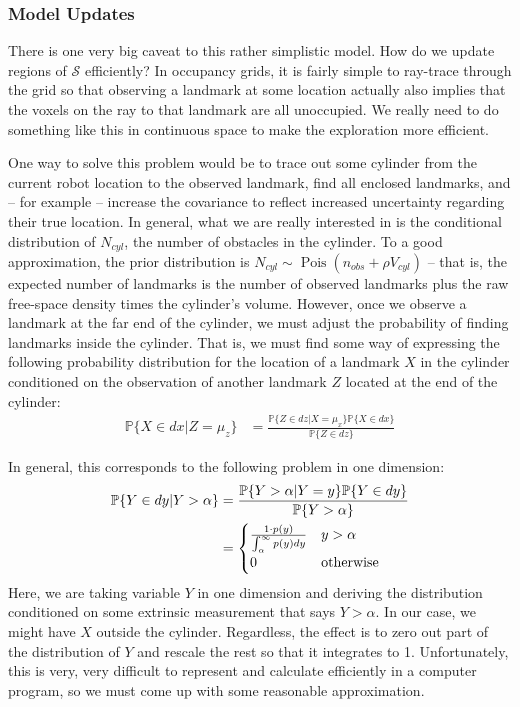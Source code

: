 \documentclass[12pt]{article}
\DeclareMathOperator{\Pois}{Pois}
\begin{document}
\subsubsection{Model Updates}

There is one very big caveat to this rather simplistic model. How do we update regions of $\mathcal{S}$ efficiently? In occupancy grids, it is fairly simple to ray-trace through the grid so that observing a landmark at some location actually also implies that the voxels on the ray to that landmark are all unoccupied. We really need to do something like this in continuous space to make the exploration more efficient.

One way to solve this problem would be to trace out some cylinder from the current robot location to the observed landmark, find all enclosed landmarks, and -- for example -- increase the covariance to reflect increased uncertainty regarding their true location. In general, what we are really interested in is the conditional distribution of $N_{cyl}$, the number of obstacles in the cylinder. To a good approximation, the prior distribution is $N_{cyl} \sim \Pois(n_{obs} + \rho V_{cyl})$ -- that is, the expected number of landmarks is the number of observed landmarks plus the raw free-space density times the cylinder's volume. However, once we observe a landmark at the far end of the cylinder, we must adjust the probability of finding landmarks inside the cylinder. That is, we must find some way of expressing the following probability distribution for the location of a landmark $X$ in the cylinder conditioned on the observation of another landmark $Z$ located at the end of the cylinder:
\begin{align}
  \mathbb{P}\{X \in dx | Z = \mu_z\} &=
  \frac{\mathbb{P}\{Z \in dz | X = \mu_x\} \mathbb{P}\{X \in dx\}}{\mathbb{P}\{Z \in dz\}}
\end{align}

In general, this corresponds to the following problem in one dimension:
\begin{align}
  \mathbb{P}\{Y \in dy | Y > \alpha\} &=
  \frac{\mathbb{P}\{Y > \alpha | Y = y\} \mathbb{P}\{Y \in dy\}}{\mathbb{P}\{Y > \alpha\}} \\
  &= \begin{cases}
    \frac{1 \cdot p(y)}{\int_{\alpha}^{\infty} p(y) dy} & y > \alpha \\
    0 & \textnormal{otherwise}
  \end{cases}
\end{align}
Here, we are taking variable $Y$ in one dimension and deriving the distribution conditioned on some extrinsic measurement that says $Y > \alpha$. In our case, we might have $X$ outside the cylinder. Regardless, the effect is to zero out part of the distribution of $Y$ and rescale the rest so that it integrates to 1. Unfortunately, this is very, very difficult to represent and calculate efficiently in a computer program, so we must come up with some reasonable approximation.
\end{document}
